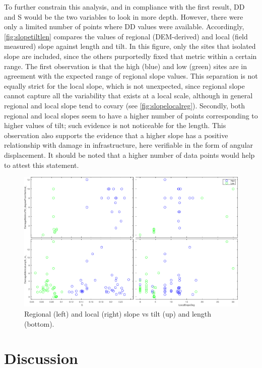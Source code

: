 \documentclass[final,12pt,times,twocolumn,authoryear]{elsarticle}
\begin{document}
To further constrain this analysis, and in compliance with the first result, DD and S would be the two variables to look in more depth. However, there were only a limited number of points where DD values were available. Accordingly, \autoref{fig:slopetiltlen} compares the values of regional (DEM-derived) and local (field measured) slope against length and tilt. In this figure, only the sites that isolated slope are included, since the others purportedly fixed that metric within a certain range. The first observation is that the high (blue) and low (green) sites are in agreement with the expected range of regional slope values. This separation is not equally strict for the local slope, which is not unexpected, since regional slope cannot capture all the variability that exists at a local scale, although in general regional and local slope tend to covary (see \autoref{fig:slopelocalreg}). Secondly, both regional and local slopes seem to have a higher number of points corresponding to higher values of tilt; such evidence is not noticeable for the length. This observation also supports the evidence that a higher slope has a positive relationship with damage in infrastructure, here verifiable in the form of angular displacement. It should be noted that a higher number of data points would help to attest this statement.

\begin{figure}[hbt]
	\centering
	\includegraphics[width=\linewidth]{fig/tilt_and_length_vs_slope_site}
	\caption{Regional (left) and local (right) slope vs tilt (up) and length (bottom).}
	\label{fig:slopetiltlen}
\end{figure}

\section{Discussion}
\label{s:disc}
\end{document}
